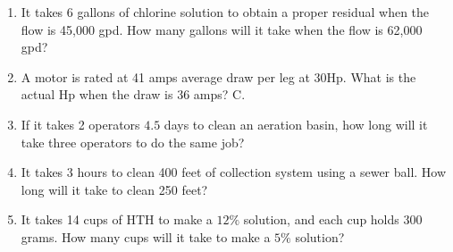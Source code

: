 \documentclass{article}
\begin{document}
\begin{enumerate}
\item It takes 6 gallons of chlorine solution to obtain a proper residual when the flow is 45,000 gpd. How many gallons will it take when the flow is 62,000 gpd?

\item A motor is rated at 41 amps average draw per leg at $30 \mathrm{Hp}$. What is the actual $\mathrm{Hp}$ when the draw is 36 amps? C. 

\item If it takes 2 operators $4.5$ days to clean an aeration basin, how long will it take three operators to do the same job?

\item It takes 3 hours to clean 400 feet of collection system using a sewer ball. How long will it take to clean 250 feet?

\item It takes 14 cups of $\mathrm{HTH}$ to make a $12 \%$ solution, and each cup holds 300 grams. How many cups will it take to make a $5 \%$ solution?
\end{enumerate}
\vspace{1cm}
\end{document}
